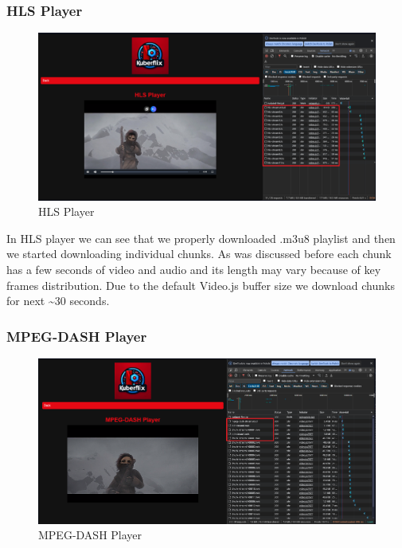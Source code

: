 \documentclass{article}
\begin{document}
\subsubsection{HLS Player}\label{hls-player}

\begin{figure}[H]
\centering
\includegraphics[width=\textwidth]{images/3_hls_player.png}
\caption{HLS Player}
\end{figure}

In HLS player we can see that we properly downloaded .m3u8 playlist and
then we started downloading individual chunks. As was discussed before
each chunk has a few seconds of video and audio and its length may vary
because of key frames distribution. Due to the default Video.js buffer
size we download chunks for next \textasciitilde 30 seconds.

\subsubsection{MPEG-DASH Player}\label{mpeg-dash-player}

\begin{figure}[H]
\centering
\includegraphics[width=\textwidth]{images/4_mpeg-dash_player.png}
\caption{MPEG-DASH Player}
\end{figure}
\end{document}
